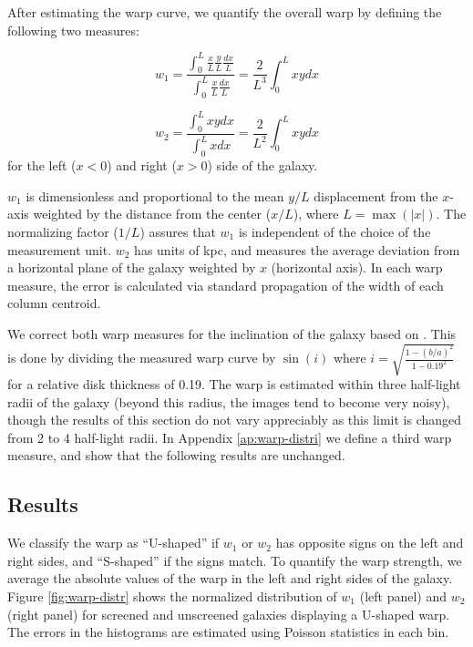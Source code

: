 \documentclass[useAMS,usenatbib,twocolumn]{mn2e}
\begin{document}
After estimating the warp curve, we quantify the overall
warp by defining the following two measures:

\begin{equation}
w_1 =  \frac{\int_0^L \frac{x}{L} \frac{y}{L} \frac{dx}{L}}{\int_0^L
\frac{x}{L}\frac{dx}{L}}=\frac{2}{L^3} \int_0^L x y dx
\label{warp-param} 
\end{equation}

\begin{equation}
w_2 = \frac{\int_0^L{x y dx}}{\int_0^L{x dx}}=\frac{2}{L^2} \int_0^L x y dx
\label{warp-param2} 
\end{equation} 
for the left ($x < 0$) and right ($x > 0$) side of the galaxy.

$w_1$ is dimensionless and proportional to the mean $y/L$ displacement from the
$x$-axis weighted by the distance from the center ($x/L$),
where $L = \max(|x|)$.
The normalizing factor ($1/L$) assures that $w_1$ is independent
of the choice of the measurement unit.
$w_2$ has units of kpc, and measures the average deviation from a
horizontal plane of the galaxy weighted by $x$ (horizontal axis).
In each warp measure, the error is calculated via standard propagation
of the width of each column centroid.

We correct both warp measures
for the inclination of the galaxy based on \citet{geha06}.
This is done by dividing the measured warp curve by $\sin(i)$ where $i =
\sqrt{\frac{1 - (b/a)^2}{1 - 0.19^2}}$ for a relative disk thickness of 0.19.
The warp is estimated within three half-light radii of the galaxy (beyond
this radius, the images tend to become very noisy), though the results of
this section do not vary
appreciably as this limit is changed from 2 to 4 half-light radii.
In Appendix \ref{ap:warp-distri} we define a third warp measure,
and show that the following results are unchanged.

\subsection{Results}
We classify the warp as ``U-shaped'' if $w_1$ or $w_2$ has opposite signs on
the left
and right sides, and ``S-shaped'' if the signs match.
To quantify the warp strength, we average the absolute values of the
warp in the left and right sides of the galaxy.
Figure \ref{fig:warp-distr} shows the normalized distribution of $w_1$ 
(left panel) and $w_2$ (right panel) 
for screened and unscreened galaxies displaying a
U-shaped warp. The errors in the histograms are estimated using Poisson
statistics in each bin.
\end{document}

